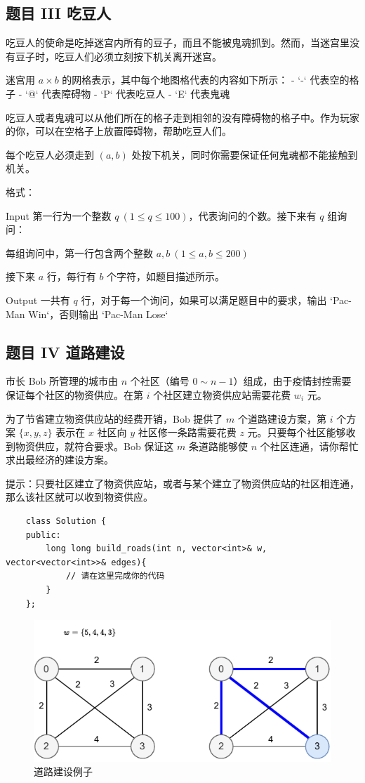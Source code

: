 \documentclass[12pt,a4paper]{article}
\begin{document}
\subsection{题目 III 吃豆人}

吃豆人的使命是吃掉迷宫内所有的豆子，而且不能被鬼魂抓到。然而，当迷宫里没有豆子时，吃豆人们必须立刻按下机关离开迷宫。

迷宫用 $a \times b$ 的网格表示，其中每个地图格代表的内容如下所示：
- `-` 代表空的格子
- `@` 代表障碍物
- `P` 代表吃豆人
- `E` 代表鬼魂

吃豆人或者鬼魂可以从他们所在的格子走到相邻的没有障碍物的格子中。作为玩家的你，可以在空格子上放置障碍物，帮助吃豆人们。

每个吃豆人必须走到 $(a, b)$ 处按下机关，同时你需要保证任何鬼魂都不能接触到机关。

格式：

Input
第一行为一个整数 $q \ (1 \leq q \leq 100)$，代表询问的个数。接下来有 $q$ 组询问：

每组询问中，第一行包含两个整数 $a, b \ (1 \leq a, b \leq 200)$

接下来 $a$ 行，每行有 $b$ 个字符，如题目描述所示。

Output
一共有 $q$ 行，对于每一个询问，如果可以满足题目中的要求，输出 `Pac-Man Win`，否则输出 `Pac-Man Lose`

\subsection{题目 IV 道路建设}

市长 Bob 所管理的城市由 $n$ 个社区（编号 $0\sim n-1$）组成，由于疫情封控需要保证每个社区的物资供应。在第 $i$ 个社区建立物资供应站需要花费 $w_i$ 元。

为了节省建立物资供应站的经费开销，Bob 提供了 $m$ 个道路建设方案，第 $i$ 个方案 $\{x, y, z\}$ 表示在 $x$ 社区向 $y$ 社区修一条路需要花费 $z$ 元。只要每个社区能够收到物资供应，就符合要求。Bob 保证这 $m$ 条道路能够使 $n$ 个社区连通，请你帮忙求出最经济的建设方案。

提示：只要社区建立了物资供应站，或者与某个建立了物资供应站的社区相连通，那么该社区就可以收到物资供应。
\begin{lstlisting}
    class Solution {
    public:
        long long build_roads(int n, vector<int>& w, vector<vector<int>>& edges){
            // 请在这里完成你的代码
        }
    };
\end{lstlisting}
\begin{figure}[h]
    \centering
    \includegraphics[width=12cm]{img/lab6/build_roads.pdf}
    \caption{道路建设例子}
    \label{fig:build_roads}
\end{figure}
\end{document}
